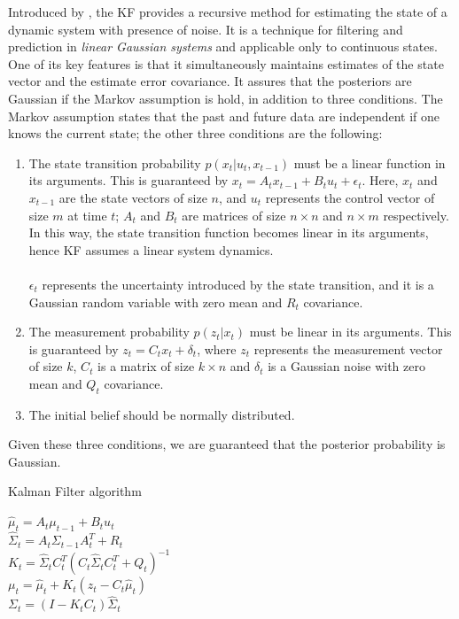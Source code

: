 Introduced by \cite{kalman}, the \ac{KF} provides a recursive method for estimating the state of a dynamic system with presence of noise. It is a technique for filtering and prediction in \emph{linear Gaussian systems} and applicable only to continuous states. One of its key features is that it simultaneously maintains estimates of the state vector and the estimate error covariance. It assures that the posteriors are Gaussian if the Markov assumption is hold, in addition to three conditions. The Markov assumption states that the past and future data are independent if one knows the current state; the other three conditions are the following:
\begin{enumerate}
    \item{The state transition probability $p\left( x_t | u_t, x_{t-1}\right)$ must be a linear function in its arguments. This is guaranteed by $ x_t = A_t x_{t-1} + B_t u_t + \epsilon_t $. Here, $x_t$ and $x_{t-1}$ are the state vectors of size $n$, and $u_t$ represents the control vector of size $m$ at time $t$; $A_t$ and $B_t$ are matrices of size $n \times n$ and $n\times m$ respectively. In this way, the state transition function becomes linear in its arguments, hence \ac{KF} assumes a linear system dynamics. \\\\ $\epsilon_t$ represents the uncertainty introduced by the state transition, and it is a Gaussian random variable with zero mean and $R_t$ covariance.}
    \item{The measurement probability $p\left(z_t | x_t\right)$ must be linear in its arguments. This is guaranteed by $z_t = C_t x_t + \delta_t$, where $z_t$ represents the measurement vector of size $k$, $C_t$ is a matrix of size $k \times n$ and $\delta_t$ is a Gaussian noise with zero mean and $Q_t$ covariance.}
    \item{The initial belief should be normally distributed.}
\end{enumerate}
Given these three conditions, we are guaranteed that the posterior probability is Gaussian.\\
\begin{algorithm}[h]
    \caption{Kalman Filter algorithm}
    \label{alg:chapter1:kf}

    \BlankLine
    \BlankLine
    $\hat\mu_t = A_t \mu_{t-1} + B_t u_t$ \\
    $\hat\Sigma_t = A_t \Sigma_{t-1} A_t^T + R_t$ \\
    \BlankLine
    $K_t = \hat\Sigma_t C_t^T \left(C_t \hat\Sigma_t C_t^T + Q_t\right)^{-1}$ \\
    $\mu_t = \hat\mu_t + K_t \left(z_t - C_t \hat\mu_t \right) $ \\
    $\Sigma_t = (I - K_t C_t) \hat\Sigma_t$ \\
    \BlankLine
\end{algorithm}

